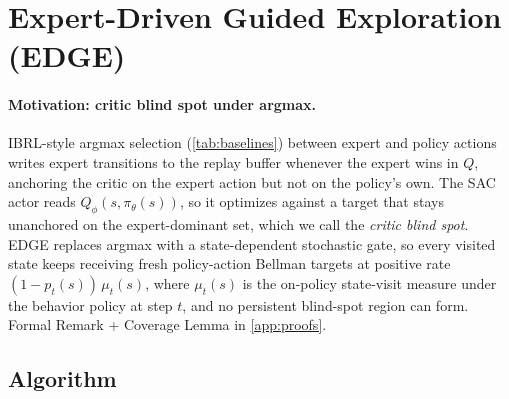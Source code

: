 \documentclass{article}
\begin{document}
\section{Expert-Driven Guided Exploration (EDGE)}
\label{sec:method}

\paragraph{Motivation: critic blind spot under argmax.}
IBRL-style argmax selection (\cref{tab:baselines}) between expert
and policy actions writes expert transitions to the replay buffer
whenever the expert wins in $Q$, anchoring the critic on the expert
action but not on the policy's own. The SAC
actor reads $Q_\phi(s, \pi_\theta(s))$, so it optimizes against a
target that stays unanchored on the expert-dominant set, which we
call the \emph{critic blind spot}. EDGE replaces argmax with a
state-dependent stochastic gate, so every visited state keeps
receiving fresh policy-action Bellman targets at positive rate
$(1-p_t(s))\,\mu_t(s)$, where $\mu_t(s)$ is the on-policy state-visit
measure under the behavior policy at step $t$, and no persistent
blind-spot region can form.
Formal Remark + Coverage Lemma in \cref{app:proofs}.

\subsection{Algorithm}
\end{document}
